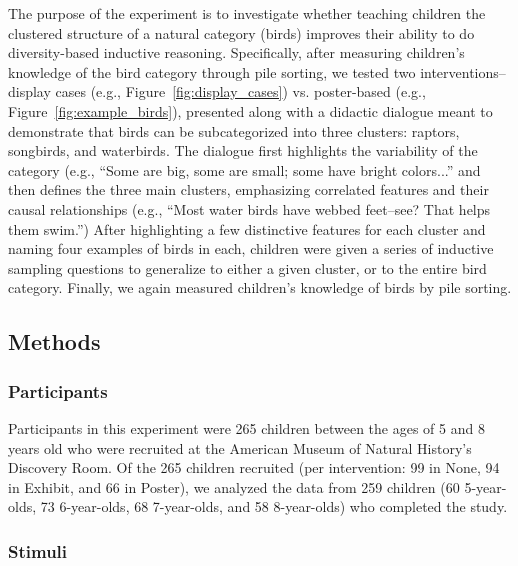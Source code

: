 \documentclass[10pt,letterpaper]{article}
\begin{document}
The purpose of the experiment is to investigate whether teaching children the clustered structure of a natural category (birds) improves their ability to do diversity-based inductive reasoning.
Specifically, after measuring children's knowledge of the bird category through pile sorting, we tested two interventions--display cases (e.g., Figure~\ref{fig:display_cases}) vs. poster-based (e.g., Figure~\ref{fig:example_birds}), presented along with a didactic dialogue meant to demonstrate that birds can be subcategorized into three clusters: raptors, songbirds, and waterbirds. 
The dialogue first highlights the variability of the category (e.g., ``Some are big, some are small; some have bright colors...'' and then defines the three main clusters, emphasizing correlated features and their causal relationships (e.g., ``Most water birds have webbed feet--see? That helps them swim.'')
After highlighting a few distinctive features for each cluster and naming four examples of birds in each, children were given a series of inductive sampling questions to generalize to either a given cluster, or to the entire bird category.
Finally, we again measured children's knowledge of birds by pile sorting.


\subsection{Methods}

\subsubsection{Participants}

Participants in this experiment were 265 children between the ages of 5 and 8 years old who were recruited at the American Museum of Natural History's Discovery Room. 
Of the 265 children recruited (per intervention: 99 in None, 94 in Exhibit, and 66 in Poster), we analyzed the data from 259 children (60 5-year-olds, 73 6-year-olds, 68 7-year-olds, and 58 8-year-olds) who completed the study.

\subsubsection{Stimuli}
\end{document}
